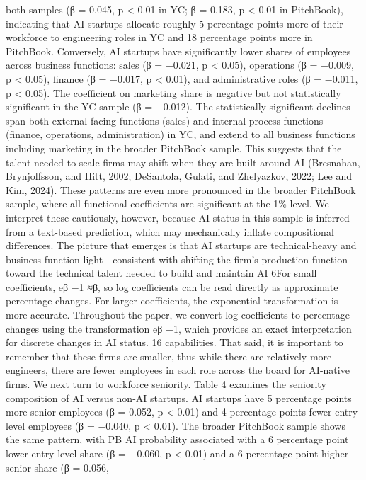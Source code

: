 both samples (β = 0.045, p < 0.01 in YC; β = 0.183, p < 0.01 in PitchBook), indicating that AI
startups allocate roughly 5 percentage points more of their workforce to engineering roles in YC and
18 percentage points more in PitchBook. Conversely, AI startups have significantly lower shares
of employees across business functions: sales (β = −0.021, p < 0.05), operations (β = −0.009,
p < 0.05), finance (β = −0.017, p < 0.01), and administrative roles (β = −0.011, p < 0.05).
The coefficient on marketing share is negative but not statistically significant in the YC sample
(β = −0.012). The statistically significant declines span both external-facing functions (sales) and
internal process functions (finance, operations, administration) in YC, and extend to all business
functions including marketing in the broader PitchBook sample.
This suggests that the talent
needed to scale firms may shift when they are built around AI (Bresnahan, Brynjolfsson, and Hitt,
2002; DeSantola, Gulati, and Zhelyazkov, 2022; Lee and Kim, 2024). These patterns are even more
pronounced in the broader PitchBook sample, where all functional coefficients are significant at
the 1\% level. We interpret these cautiously, however, because AI status in this sample is inferred
from a text-based prediction, which may mechanically inflate compositional differences. The picture
that emerges is that AI startups are technical-heavy and business-function-light—consistent with
shifting the firm’s production function toward the technical talent needed to build and maintain AI
6For small coefficients, eβ −1 ≈β, so log coefficients can be read directly as approximate percentage changes. For
larger coefficients, the exponential transformation is more accurate. Throughout the paper, we convert log
coefficients to percentage changes using the transformation eβ −1, which provides an exact interpretation for
discrete changes in AI status.
16
capabilities. That said, it is important to remember that these firms are smaller, thus while there
are relatively more engineers, there are fewer employees in each role across the board for AI-native
firms.
We next turn to workforce seniority. Table 4 examines the seniority composition of AI versus
non-AI startups. AI startups have 5 percentage points more senior employees (β = 0.052, p < 0.01)
and 4 percentage points fewer entry-level employees (β = −0.040, p < 0.01). The broader PitchBook
sample shows the same pattern, with PB AI probability associated with a 6 percentage point lower
entry-level share (β = −0.060, p < 0.01) and a 6 percentage point higher senior share (β = 0.056,
